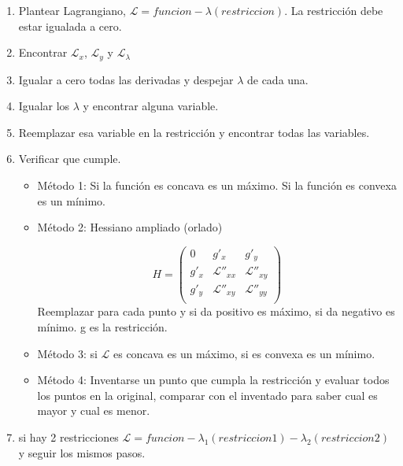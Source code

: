 \begin{enumerate}
	\item Plantear Lagrangiano, $\mathcal{L}=funcion - \lambda(restriccion)$. La restricción debe estar igualada a cero.
	\item Encontrar $\mathcal{L}_x$, $\mathcal{L}_y$ y $\mathcal{L}_\lambda$
	\item Igualar a cero todas las derivadas y despejar $\lambda$ de cada una.
	\item Igualar los $\lambda$ y encontrar alguna variable.
	\item Reemplazar esa variable en la restricción y encontrar todas las variables.
	\item Verificar que cumple.
	\begin{itemize}
		 \item Método 1: Si la función es concava es un máximo. Si la función es convexa es un mínimo.
		 \item Método 2: Hessiano ampliado (orlado)
		 
		 $$H=\begin{pmatrix}
		 0 & g'_x & g'_y \\
		 g'_x & \mathcal{L}''_{xx} & \mathcal{L}''_{xy} \\
		 g'_y & \mathcal{L}''_{xy} & \mathcal{L}''_{yy} \\
		 \end{pmatrix}$$
		 Reemplazar para cada punto y si da positivo es máximo, si da negativo es mínimo. g es la restricción.
		 \item Método 3: si $\mathcal{L}$ es concava es un máximo, si es convexa es un mínimo.
		 \item Método 4: Inventarse un punto que cumpla la restricción y evaluar todos los puntos en la original, comparar con el inventado para saber cual es mayor y cual es menor.
		 
	\end{itemize}
	\item si hay 2 restricciones  $\mathcal{L}=funcion - \lambda_1(restriccion1)-\lambda_2(restriccion2)$ y seguir los mismos pasos.
\end{enumerate}